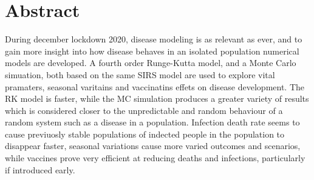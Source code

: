 \section*{Abstract}
During december lockdown 2020, disease modeling is as relevant as ever, and to gain more insight into how disease behaves in an isolated population numerical models are developed.
A fourth order Runge-Kutta model, and a Monte Carlo simuation, both based on the same SIRS model are used to explore vital pramaters, seasonal varitains and vaccinatins effets on disease development.
The RK model is faster, while the MC simulation produces a greater variety of results which is considered closer to the unpredictable and random behaviour of a random system such as a disease in a population.
Infection death rate seems to cause previuosly stable populations of indected people in the population to disappear faster, seasonal variations cause more varied outcomes and scenarios, while vaccines prove very efficient at reducing deaths and infections, particularly if introduced early.